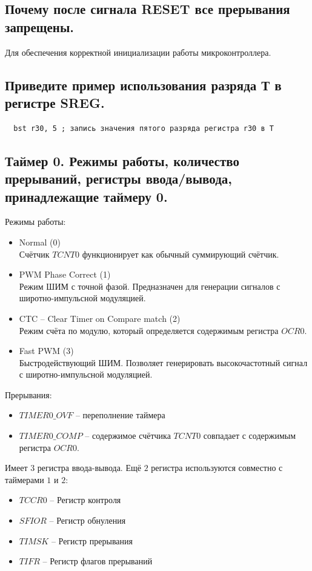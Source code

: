 \subsection{Почему после сигнала RESET все прерывания запрещены.}
Для обеспечения корректной инициализации работы
микроконтроллера.

\subsection{Приведите пример использования разряда Т в регистре SREG.}
\begin{verbatim}
  bst r30, 5 ; запись значения пятого разряда регистра r30 в T
\end{verbatim}


\subsection{Таймер 0. Режимы работы, количество прерываний, регистры ввода/вывода, принадлежащие таймеру 0.}

Режимы работы:
\begin{itemize}
  \item Normal (0)\\
  Счётчик $TCNT0$ функционирует как обычный суммирующий счётчик.
  \item PWM Phase Correct (1)\\
  Режим ШИМ с точной фазой. Предназначен для генерации сигналов с 
  широтно-импульсной модуляцией.
  \item CTC -- Clear Timer on Compare match (2)\\
  Режим счёта по модулю, который определяется содержимым регистра $OCR0$.
  \item Fast PWM (3) \\
  Быстродействующий ШИМ. Позволяет генерировать высокочастотный сигнал 
  с широтно-импульсной модуляцией.
\end{itemize}

Прерывания:
\begin{itemize}
  \item $TIMER0\_OVF$ -- переполнение таймера
  \item $TIMER0\_COMP$ -- содержимое счётчика $TCNT0$ совпадает с 
  содержимым регистра $OCR0$.
\end{itemize}

Имеет $3$ регистра ввода-вывода. Ещё $2$ регистра используются совместно 
с таймерами $1$ и $2$:
\begin{itemize}
  \item $TCCR0$ -- Регистр контроля
  \item $SFIOR$ -- Регистр обнуления
  \item $TIMSK$ -- Регистр прерывания
  \item $TIFR$ -- Регистр флагов прерываний
\end{itemize}

